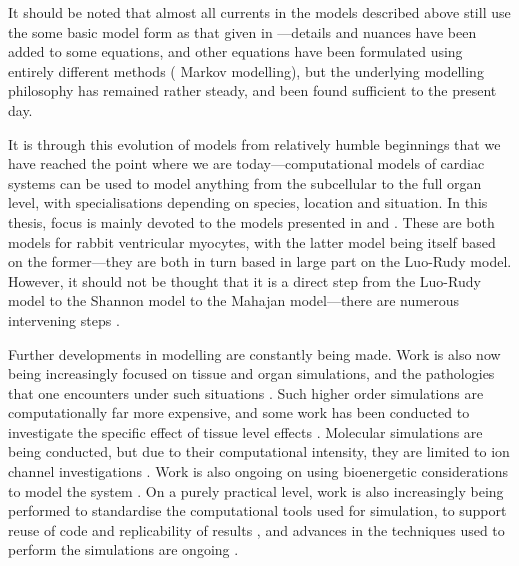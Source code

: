 \documentclass[../thesis-main.tex]{subfiles}
\begin{document}
It should be noted that almost all currents in the models described above still use the some basic model form as that given in \citet{Hodgkin1952}---details and nuances have been added to some equations, and other equations have been formulated using entirely different methods (\eg{} Markov modelling), but the underlying modelling philosophy has remained rather steady, and been found sufficient to the present day.

It is through this evolution of models from relatively humble beginnings that we have reached the point where we are today---computational models of cardiac systems can be used to model anything from the subcellular to the full organ level, with specialisations depending on species, location and situation. In this thesis, focus is mainly devoted to the models presented in \citet{Shannon2004} and \citet{Mahajan2008}. These are both models for rabbit ventricular myocytes, with the latter model being itself based on the former---they are both in turn based in large part on the Luo-Rudy model. However, it should not be thought that it is a direct step from the Luo-Rudy model to the Shannon model to the Mahajan model---there are numerous intervening steps \citep{Zeng1995, Puglisi2001, Bassani2004}.

Further developments in modelling are constantly being made. Work is also now being increasingly focused on tissue and organ simulations, and the pathologies that one encounters under such situations \citep{PittFrancis2009, Arevalo2007}. Such higher order simulations are computationally far more expensive, and some work has been conducted to investigate the specific effect of tissue level effects \citep{Viswanathan2000}. Molecular simulations are being conducted, but due to their computational intensity, they are limited to ion channel investigations \citep{Nekouzadeh2011}. Work is also ongoing on using bioenergetic considerations to model the system \citep{Niederer2013}. On a purely practical level, work is also increasingly being performed to standardise the computational tools used for simulation, to support reuse of code and replicability of results \citep{PittFrancis2009, Mirams2013}, and advances in the techniques used to perform the simulations are ongoing \citep{Dangerfield2012a}.
\end{document}
